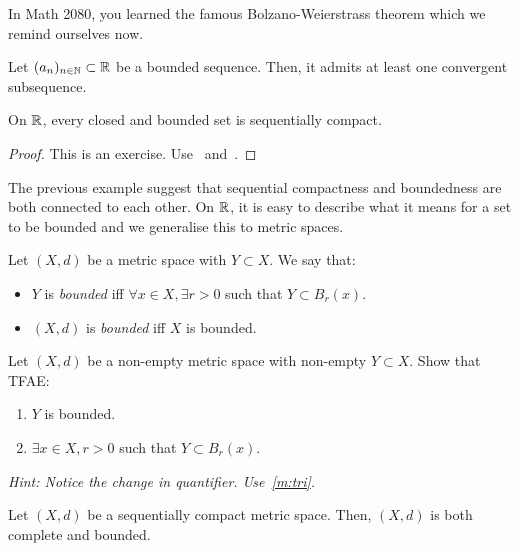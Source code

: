 In Math 2080, you learned the famous Bolzano-Weierstrass theorem which we remind ourselves now.
\begin{thm}
\label{thm:bw}
Let $(a_n)_{n\in\mathbb{N}}\subset \mathbb{R}$ be a bounded sequence. Then, it admits at least one convergent subsequence.
\end{thm}
\begin{cor}
	\label{cor:bw}
On $\mathbb{R}$, every closed and bounded set is sequentially compact.
\end{cor}
\begin{proof}
	This is an exercise. Use~ and~.
\end{proof}
The previous example suggest that sequential compactness and boundedness are both connected to each other. On $\mathbb{R}$, it is easy to describe what it means for a set to be bounded and we generalise this to metric spaces.
\begin{defn}[Bounded]
	\label{defn:bdd}
Let $(X,d)$ be a metric space with $Y\subset X$. We say that:
\begin{itemize}
	\item $Y$ is \textit{bounded} iff $\forall x\in X, \exists r>0$ such that $Y\subset B_r(x)$.
	\item $(X,d)$ is \textit{bounded} iff $X$ is bounded.
\end{itemize}
\end{defn}
\begin{ex}
Let $(X,d)$ be a non-empty metric space with non-empty $Y\subset X$. Show that TFAE:
\begin{enumerate}
	\item $Y$ is bounded.
	\item $\exists x\in X, r>0$ such that $Y\subset B_r(x)$.
\end{enumerate}
\textit{Hint: Notice the change in quantifier. Use~\ref{m:tri}.}
\end{ex}
\begin{prop}
	\label{prop:seq_cpct_cmpl_bdd}
Let $(X,d)$ be a sequentially compact metric space. Then, $(X,d)$ is both complete and bounded.
\end{prop}
